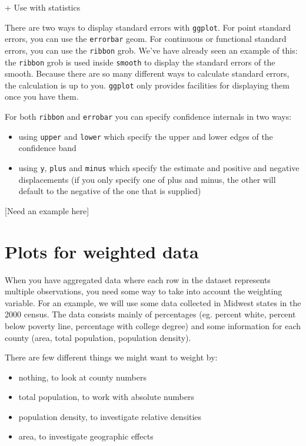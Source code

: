 + Use with statistics

There are two ways to display standard errors with {\tt ggplot}.  For point standard errors, you can use the {\tt errorbar} geom.  For continuous or functional standard errors, you can use the {\tt ribbon} grob.  We've have already seen an example of this: the {\tt ribbon} grob is used inside {\tt smooth} to display the standard errors of the smooth.  Because there are so many different ways to calculate standard errors, the calculation is up to you.  {\tt ggplot} only provides facilities for displaying them once you have them.

For both {\tt ribbon} and {\tt errobar} you can specify confidence internals in two ways:

\begin{itemize}
	\item using {\tt upper} and {\tt lower} which specify the upper and lower edges of the confidence band

	\item using {\tt y}, {\tt plus} and {\tt minus} which specify the estimate and positive and negative displacements (if you only specify one of plus and minus, the other will default to the negative of the one that is supplied)
\end{itemize}

[Need an example here]

\section{Plots for weighted data}\label{sec:weighted_data}

When you have aggregated data where each row in the dataset represents multiple observations, you need some way to take into account the weighting variable.  For an example, we will use some data collected in Midwest states in the 2000 census.  The data consists mainly of percentages (eg. percent white, percent below poverty line, percentage with college degree) and some information for each county (area, total population, population density).

There are few different things we might want to weight by: 

\begin{itemize}
	\item nothing, to look at county numbers
	\item total population, to work with absolute numbers
	\item population density, to investigate relative densities
	\item area, to investigate geographic effects
\end{itemize}

